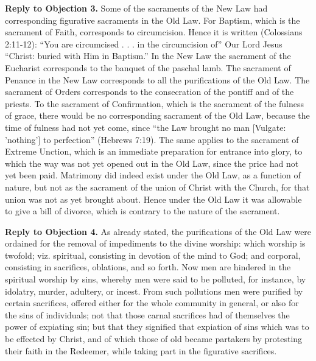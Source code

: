 \textbf{Reply to Objection 3.} Some of the sacraments of the New Law had corresponding figurative sacraments in the Old Law. For Baptism, which is the sacrament of Faith, corresponds to circumcision. Hence it is written (Colossians 2:11-12): ``You are circumcised . . . in the circumcision of'' Our Lord Jesus ``Christ: buried with Him in Baptism.'' In the New Law the sacrament of the Eucharist corresponds to the banquet of the paschal lamb. The sacrament of Penance in the New Law corresponds to all the purifications of the Old Law. The sacrament of Orders corresponds to the consecration of the pontiff and of the priests. To the sacrament of Confirmation, which is the sacrament of the fulness of grace, there would be no corresponding sacrament of the Old Law, because the time of fulness had not yet come, since ``the Law brought no man [Vulgate: 'nothing'] to perfection'' (Hebrews 7:19). The same applies to the sacrament of Extreme Unction, which is an immediate preparation for entrance into glory, to which the way was not yet opened out in the Old Law, since the price had not yet been paid. Matrimony did indeed exist under the Old Law, as a function of nature, but not as the sacrament of the union of Christ with the Church, for that union was not as yet brought about. Hence under the Old Law it was allowable to give a bill of divorce, which is contrary to the nature of the sacrament.

\textbf{Reply to Objection 4.} As already stated, the purifications of the Old Law were ordained for the removal of impediments to the divine worship: which worship is twofold; viz. spiritual, consisting in devotion of the mind to God; and corporal, consisting in sacrifices, oblations, and so forth. Now men are hindered in the spiritual worship by sins, whereby men were said to be polluted, for instance, by idolatry, murder, adultery, or incest. From such pollutions men were purified by certain sacrifices, offered either for the whole community in general, or also for the sins of individuals; not that those carnal sacrifices had of themselves the power of expiating sin; but that they signified that expiation of sins which was to be effected by Christ, and of which those of old became partakers by protesting their faith in the Redeemer, while taking part in the figurative sacrifices.

